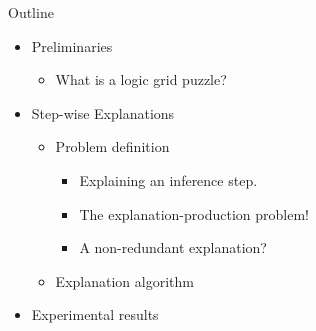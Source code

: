 \documentclass{beamer}
\begin{document}
\begin{frame}{Outline}

    \begin{itemize}
        \item Preliminaries
              \begin{itemize}
                  \item What is a logic grid puzzle?
              \end{itemize}
        \item Step-wise Explanations
              \begin{itemize}
                  \item Problem definition
                        \begin{itemize}
                            \item Explaining an inference step.
                            \item The explanation-production problem!
                            \item A non-redundant explanation?
                        \end{itemize}
                  \item Explanation algorithm
              \end{itemize}
        \item Experimental results
    \end{itemize}
\end{frame}
\end{document}
